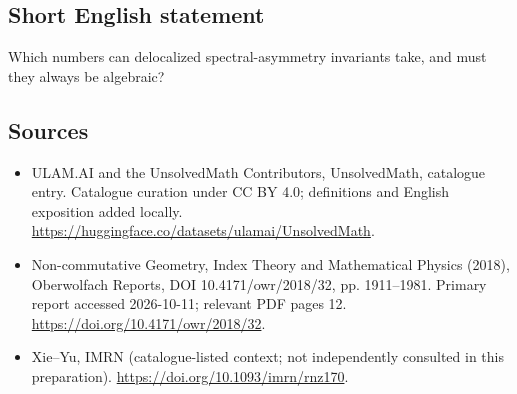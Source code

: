 \documentclass[11pt]{article}
\begin{document}
\subsection{Short English statement}
Which numbers can delocalized spectral-asymmetry invariants take, and must they always be algebraic?
\subsection{Sources}
\begin{itemize}
\item[\hypertarget{source:statement:1}{S1}] ULAM.AI and the UnsolvedMath Contributors, UnsolvedMath, catalogue entry. Catalogue curation under CC BY 4.0; definitions and English exposition added locally.
\url{https://huggingface.co/datasets/ulamai/UnsolvedMath}.
\item[\hypertarget{source:statement:2}{S2}] Non-commutative Geometry, Index Theory and Mathematical Physics (2018), Oberwolfach Reports, DOI 10.4171/owr/2018/32, pp. 1911--1981. Primary report accessed 2026-10-11; relevant PDF pages 12.
\url{https://doi.org/10.4171/owr/2018/32}.
\item[\hypertarget{source:statement:3}{S3}] Xie--Yu, IMRN (catalogue-listed context; not independently consulted in this preparation).
\url{https://doi.org/10.1093/imrn/rnz170}.
\end{itemize}
\label{end:statement}
\end{document}
